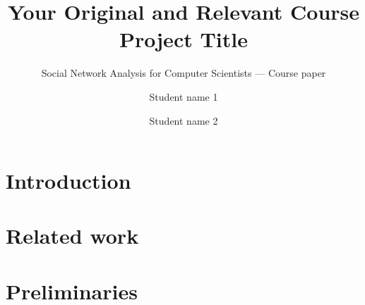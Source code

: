 \documentclass[sigconf]{acmart}
\begin{document}
\title{Your Original and Relevant Course Project Title}
\subtitle{ Social Network Analysis for Computer Scientists --- Course paper} %

\author{Student name 1}

\author{Student name 2}

\renewcommand{\shortauthors}{Lastname1 and Lastname2}


\begin{abstract}


\end{abstract}

\maketitle

\section{Introduction}


\section{Related work}


\section{Preliminaries}
\end{document}
